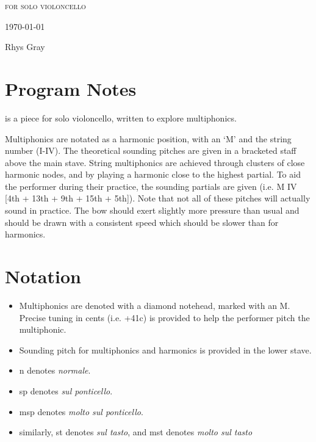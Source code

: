
\invisiblechapter{\celloPiece}

\vspace{3.8cm}

\begin{center}

\textsc{for solo violoncello}

\vspace{2.8cm}

\HRule{0.5pt}

\LARGE \textbf{\uppercase{\celloPiece}}

\HRule{2pt}

\vspace{1.8cm}

\normalsize \today

\vspace{3.8cm}

Rhys Gray

\end{center}
\newpage

\section*{Program Notes}
\celloPiece \space is a piece for solo violoncello, written to explore multiphonics. 

Multiphonics are notated as a harmonic position, with an `M' and the string number (I-IV). 
The theoretical sounding pitches are given in a bracketed staff above the main stave.
String multiphonics are achieved through clusters of close harmonic nodes, and by playing a harmonic close to the highest partial.
To aid the performer during their practice, the sounding partials are given (i.e. M IV [4th + 13th + 9th + 15th + 5th]).
Note that not all of these pitches will actually sound in practice.
The bow should exert slightly more pressure than usual and should be drawn with a consistent speed which should be slower than for harmonics.

\section*{Notation}
\begin{itemize}

    \item Multiphonics are denoted with a diamond notehead, marked with an M. Precise tuning in cents (i.e. +41c) is provided to help the performer pitch the multiphonic.
    \item Sounding pitch for multiphonics and harmonics is provided in the lower stave.
    \item n denotes \emph{normale}.
    \item sp denotes \emph{sul ponticello}.
    \item msp denotes \emph{molto sul ponticello}.
    \item similarly, st denotes \emph{sul tasto}, and mst denotes \emph{molto sul tasto}
\end{itemize}

\newpage
\label{app:to/do Score}
